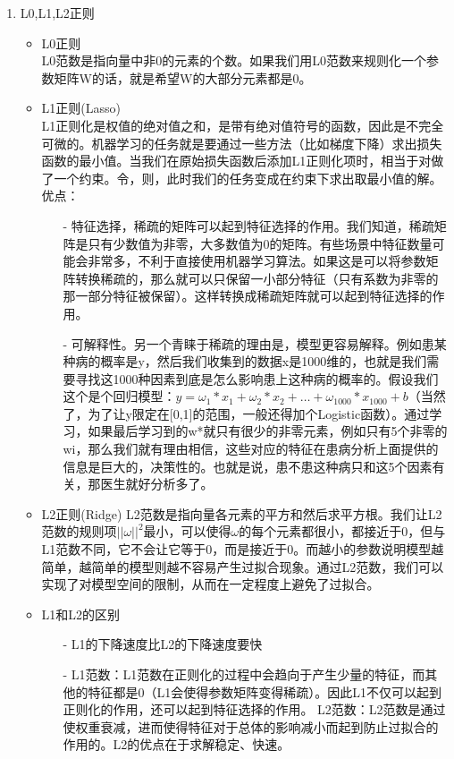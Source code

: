 \begin{enumerate}
\begin{itemize}
	\end{itemize}
	\item  L0,L1,L2正则
	\begin{itemize}
		\item L0正则\\
		L0范数是指向量中非0的元素的个数。如果我们用L0范数来规则化一个参数矩阵W的话，就是希望W的大部分元素都是0。
		\item L1正则(Lasso)\\
		L1正则化是权值的绝对值之和，是带有绝对值符号的函数，因此是不完全可微的。机器学习的任务就是要通过一些方法（比如梯度下降）求出损失函数的最小值。当我们在原始损失函数后添加L1正则化项时，相当于对做了一个约束。令，则，此时我们的任务变成在约束下求出取最小值的解。优点：
		\begin{itemize}
			\item[-]特征选择，稀疏的矩阵可以起到特征选择的作用。我们知道，稀疏矩阵是只有少数值为非零，大多数值为0的矩阵。有些场景中特征数量可能会非常多，不利于直接使用机器学习算法。如果这是可以将参数矩阵转换稀疏的，那么就可以只保留一小部分特征（只有系数为非零的那一部分特征被保留）。这样转换成稀疏矩阵就可以起到特征选择的作用。
			\item[-] 可解释性。另一个青睐于稀疏的理由是，模型更容易解释。例如患某种病的概率是y，然后我们收集到的数据x是1000维的，也就是我们需要寻找这1000种因素到底是怎么影响患上这种病的概率的。假设我们这个是个回归模型：$y=\omega_1*x_1+\omega_2*x_2+…+\omega_1000*x_1000+b$（当然了，为了让y限定在[0,1]的范围，一般还得加个Logistic函数）。通过学习，如果最后学习到的w*就只有很少的非零元素，例如只有5个非零的wi，那么我们就有理由相信，这些对应的特征在患病分析上面提供的信息是巨大的，决策性的。也就是说，患不患这种病只和这5个因素有关，那医生就好分析多了。
		\end{itemize}
		\item L2正则(Ridge)
		L2范数是指向量各元素的平方和然后求平方根。我们让L2范数的规则项$||\omega||^2$最小，可以使得$\omega$的每个元素都很小，都接近于0，但与L1范数不同，它不会让它等于0，而是接近于0。而越小的参数说明模型越简单，越简单的模型则越不容易产生过拟合现象。通过L2范数，我们可以实现了对模型空间的限制，从而在一定程度上避免了过拟合。
		\item L1和L2的区别
		\begin{itemize}
			\item[-] L1的下降速度比L2的下降速度要快\\
			\item[-] L1范数：L1范数在正则化的过程中会趋向于产生少量的特征，而其他的特征都是0（L1会使得参数矩阵变得稀疏）。因此L1不仅可以起到正则化的作用，还可以起到特征选择的作用。			L2范数：L2范数是通过使权重衰减，进而使得特征对于总体的影响减小而起到防止过拟合的作用的。L2的优点在于求解稳定、快速。
		\end{itemize}
		 
	\end{itemize}
\end{enumerate}